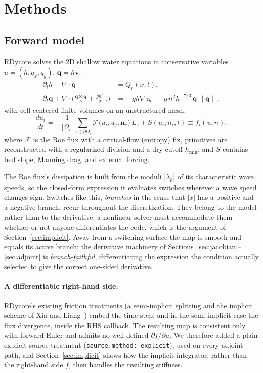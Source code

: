 \documentclass[11pt]{article}
\begin{document}
\section{Methods}
\label{sec:methods}

\subsection{Forward model}
\label{sec:forward}

RDycore solves the 2D shallow water equations in conservative variables
$u = (h, q_x, q_y)$, $\mathbf{q} = h\mathbf{v}$:
\begin{align}
  \partial_t h + \nabla\!\cdot\!\mathbf{q} &= Q_r(x,t),\\
  \partial_t \mathbf{q}
    + \nabla\!\cdot\!\Big(\tfrac{\mathbf{q}\otimes\mathbf{q}}{h}
    + \tfrac{g h^2}{2}\,\mathbb{I}\Big)
  &= -\,g h \nabla z_b \;-\; g\, n^2 h^{-7/3}\,\mathbf{q}\,\lVert\mathbf{q}\rVert,
  \label{eq:mom}
\end{align}
with cell-centered finite volumes on an unstructured mesh:
\begin{equation}
  \frac{du_i}{dt}
  = -\frac{1}{|\Omega_i|}\sum_{e \in \partial\Omega_i}
      \mathcal{F}\big(u_i, u_j, \mathbf{n}_e\big)\,L_e + S(u_i; n_i, t)
  \equiv f_i(u, n),
  \label{eq:semidiscrete}
\end{equation}
where $\mathcal{F}$ is the Roe flux with a critical-flow (entropy) fix,
primitives are reconstructed with a regularized division and a dry
cutoff $h_{\min}$, and $S$ contains bed slope, Manning drag, and
external forcing.

The Roe flux's dissipation is built from the moduli $|\lambda_p|$ of
its characteristic wave speeds, so the closed-form expression it
evaluates switches wherever a wave speed changes sign. Switches like
this, \emph{branches} in the sense that $|x|$ has a positive and a
negative branch, recur throughout the discretization. They belong to
the model rather than to the derivative: a nonlinear solver must
accommodate them whether or not anyone differentiates the code, which
is the argument of Section~\ref{sec:implicit}.
Away from a switching surface the map is smooth and equals its active
branch; the derivative machinery of
Sections~\ref{sec:jacobian}--\ref{sec:adjoint} is
\emph{branch-faithful}, differentiating the expression the condition
actually selected to give the correct one-sided derivative.

\paragraph{A differentiable right-hand side.}
RDycore's existing friction treatments (a semi-implicit splitting and
the implicit scheme of Xia and Liang~\cite{xia2018implicit}) embed the time step, and in the
semi-implicit case the flux divergence, inside the RHS callback. The
resulting map is consistent only with forward Euler and admits no
well-defined $\partial f/\partial u$. We therefore added a plain
explicit source treatment (\texttt{source.method: explicit}), used on
every adjoint path, and Section~\ref{sec:implicit} shows how the
implicit integrator, rather than the right-hand side $f$, then handles
the resulting stiffness.
\end{document}
